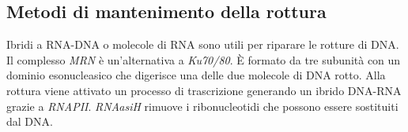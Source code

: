 	\subsection{Metodi di mantenimento della rottura}
	Ibridi a RNA-DNA o molecole di RNA sono utili per riparare le rotture di DNA.
	Il complesso \emph{MRN} \`e un'alternativa a \emph{Ku70/80}.
	\`E formato da tre subunit\`a con un dominio esonucleasico che digerisce una delle due molecole di DNA rotto.
	Alla rottura viene attivato un processo di trascrizione generando un ibrido DNA-RNA grazie a \emph{RNAPII}.
	\emph{RNAasiH} rimuove i ribonucleotidi che possono essere sostituiti dal DNA.
